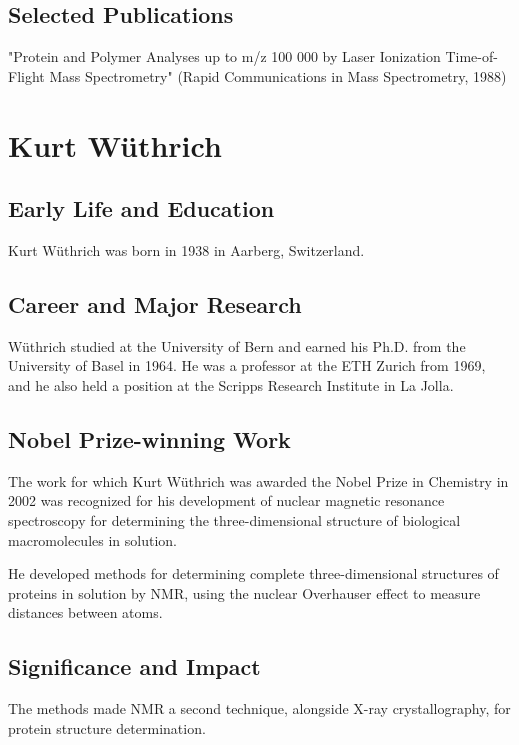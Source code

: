 \subsection*{Selected Publications}

"Protein and Polymer Analyses up to m/z 100 000 by Laser Ionization Time-of-Flight Mass Spectrometry" (Rapid Communications in Mass Spectrometry, 1988)

\clearpage

\section{Kurt Wüthrich}

\subsection*{Early Life and Education}

Kurt Wüthrich was born in 1938 in Aarberg, Switzerland.

\subsection*{Career and Major Research}

Wüthrich studied at the University of Bern and earned his Ph.D. from the University of Basel in 1964. He was a professor at the ETH Zurich from 1969, and he also held a position at the Scripps Research Institute in La Jolla.

\subsection*{Nobel Prize-winning Work}

The work for which Kurt Wüthrich was awarded the Nobel Prize in Chemistry in 2002 was recognized for his development of nuclear magnetic resonance spectroscopy for determining the three-dimensional structure of biological macromolecules in solution.

He developed methods for determining complete three-dimensional structures of proteins in solution by NMR, using the nuclear Overhauser effect to measure distances between atoms.

\subsection*{Significance and Impact}

The methods made NMR a second technique, alongside X-ray crystallography, for protein structure determination.

